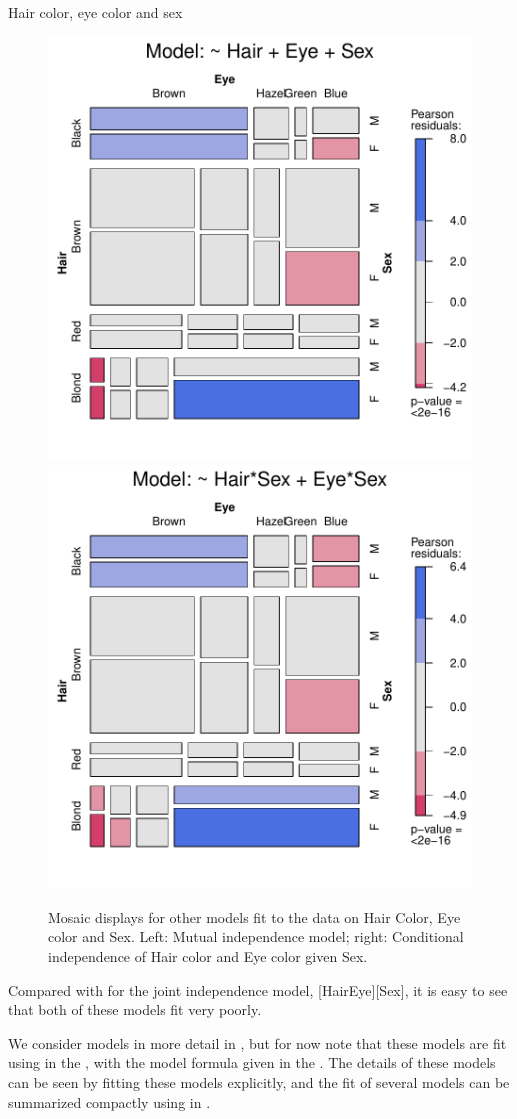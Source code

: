 \documentclass[10pt,krantz2]{krantz}\usepackage[]{graphicx}\usepackage[]{color}
\newenvironment{knitrout}{}{} %
\renewenvironment{knitrout}{\small\renewcommand{\baselinestretch}{.85}}{} %
\begin{document}
\begin{Example}[HEC2]{Hair color, eye color and sex}
\begin{knitrout}
\begin{figure}[!htbp]
\centerline{\includegraphics[width=.49\textwidth]{ch05/fig/HEC-mos2-1} 
\includegraphics[width=.49\textwidth]{ch05/fig/HEC-mos2-2} }

\caption[Mosaic displays for other models fit to the data on Hair Color, Eye color and Sex]{Mosaic displays for other models fit to the data on Hair Color, Eye color and Sex.  Left: Mutual independence model; right: Conditional independence of Hair color and Eye color given Sex.}\label{fig:HEC-mos2}
\end{figure}


\end{knitrout}
\noindent Compared with  for the joint independence model, [HairEye][Sex],
it is easy to see that both of these models fit very poorly.

We consider \loglin models in more detail in , but for now
note that these models are fit using  in the ,
with the model formula given in the .  The details of these
models can be seen by fitting these models explicitly, and the fit of
several models can be summarized compactly using 
in .


\end{Example}
\end{document}

